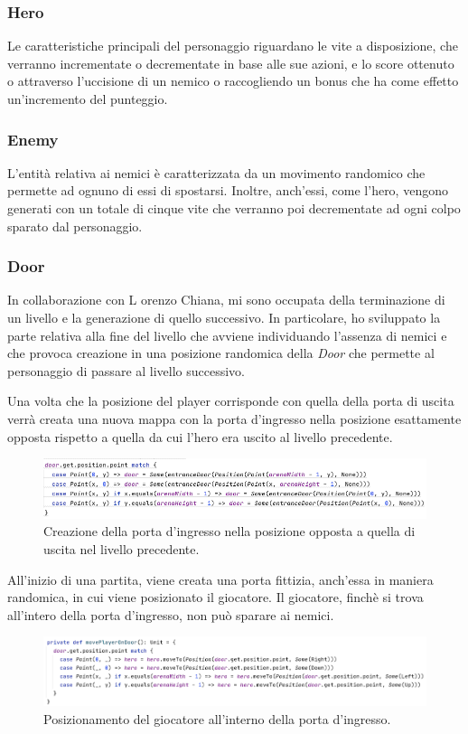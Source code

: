 \subsubsection{Hero}

Le caratteristiche principali del personaggio riguardano le vite a disposizione, che verranno incrementate o decrementate in base alle sue azioni, e lo score ottenuto o attraverso l'uccisione di un nemico o raccogliendo un bonus che ha come effetto un'incremento del punteggio.

\subsubsection{Enemy}

L'entità relativa ai nemici è caratterizzata da un movimento randomico che permette ad ognuno di essi di spostarsi. Inoltre, anch'essi, come l'hero, vengono generati con un totale di cinque vite che verranno poi decrementate ad ogni colpo sparato dal personaggio.

\subsubsection{Door}
In collaborazione con L
orenzo Chiana, mi sono occupata della terminazione di un livello e la generazione di quello successivo. In particolare, ho sviluppato la parte relativa alla fine del livello che avviene individuando l'assenza di nemici e che provoca creazione in una posizione randomica della \textit{Door} che permette al personaggio di passare al livello successivo. 

Una volta che la posizione del player corrisponde con quella della porta di uscita verrà creata una nuova mappa con la porta d'ingresso nella posizione esattamente opposta rispetto a quella da cui l'hero era uscito al livello precedente.

\begin{figure}[H]\centering
  \includegraphics[width=15cm]{res/createOppositeDoor.png}
  \caption{Creazione della porta d'ingresso nella posizione opposta a quella di uscita nel livello precedente.}
  \label{gameState}
\end{figure}

All'inizio di una partita, viene creata una porta fittizia, anch'essa in maniera randomica, in cui viene posizionato il giocatore.
Il giocatore, finchè si trova all'intero della porta d'ingresso, non può sparare ai nemici.

\begin{figure}[H]\centering
  \includegraphics[width=15cm]{res/movePlayerOnDoor.png}
  \caption{Posizionamento del giocatore all'interno della porta d'ingresso.}
  \label{gameState}
\end{figure}


